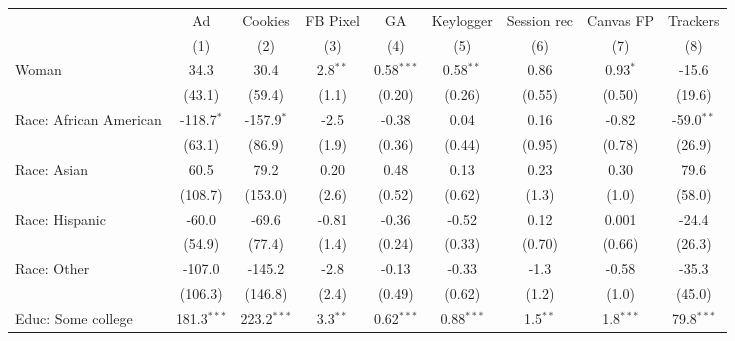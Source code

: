 
\begingroup
\centering
\begin{adjustbox}{width = \textwidth, center}
   \begin{tabular}{lcccccccc}
      \toprule
                              & Ad            & Cookies       & FB Pixel     & GA           & Keylogger    & Session rec & Canvas FP   & Trackers \\   
                              & (1)           & (2)           & (3)          & (4)          & (5)          & (6)         & (7)         & (8)\\  
      \midrule 
      Woman                   & 34.3          & 30.4          & 2.8$^{**}$   & 0.58$^{***}$ & 0.58$^{**}$  & 0.86        & 0.93$^{*}$  & -15.6\\   
                              & (43.1)        & (59.4)        & (1.1)        & (0.20)       & (0.26)       & (0.55)      & (0.50)      & (19.6)\\   
      Race: African American  & -118.7$^{*}$  & -157.9$^{*}$  & -2.5         & -0.38        & 0.04         & 0.16        & -0.82       & -59.0$^{**}$\\   
                              & (63.1)        & (86.9)        & (1.9)        & (0.36)       & (0.44)       & (0.95)      & (0.78)      & (26.9)\\   
      Race: Asian             & 60.5          & 79.2          & 0.20         & 0.48         & 0.13         & 0.23        & 0.30        & 79.6\\   
                              & (108.7)       & (153.0)       & (2.6)        & (0.52)       & (0.62)       & (1.3)       & (1.0)       & (58.0)\\   
      Race: Hispanic          & -60.0         & -69.6         & -0.81        & -0.36        & -0.52        & 0.12        & 0.001       & -24.4\\   
                              & (54.9)        & (77.4)        & (1.4)        & (0.24)       & (0.33)       & (0.70)      & (0.66)      & (26.3)\\   
      Race: Other             & -107.0        & -145.2        & -2.8         & -0.13        & -0.33        & -1.3        & -0.58       & -35.3\\   
                              & (106.3)       & (146.8)       & (2.4)        & (0.49)       & (0.62)       & (1.2)       & (1.0)       & (45.0)\\   
      Educ: Some college      & 181.3$^{***}$ & 223.2$^{***}$ & 3.3$^{**}$   & 0.62$^{***}$ & 0.88$^{***}$ & 1.5$^{**}$  & 1.8$^{***}$ & 79.8$^{***}$\\   

\end{tabular}
\end{adjustbox}

